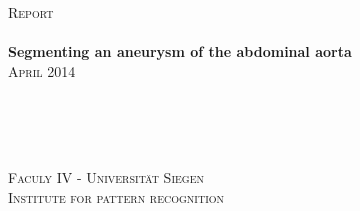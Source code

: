 \begin{titlepage}

\begin{center}

\Large{\textsc{Report}}\\[0.4cm]

\HRule \\[0.5cm]

\Huge{\bfseries{Segmenting an aneurysm of the abdominal aorta}}\\[0.5cm]

\Large{\textsc{April 2014}}\\[0.4cm]

\HRule \\[0.5cm]

\vfill

\\[0.5cm]  
\\[0.3cm]                                  

\vfill

\end{center}

\vfill
\begin{center}
    \small{\textsc{Faculy IV - Universität Siegen}}\\[0.4cm]
    \small{\textsc{Institute for pattern recognition}}\\[0.4cm]                
\end{center}

\end{titlepage}

